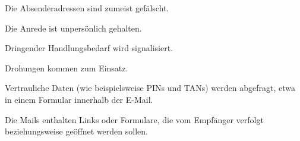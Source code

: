\item Die Absenderadressen sind zumeist gefälscht.
\item Die Anrede ist unpersönlich gehalten.
\item Dringender Handlungsbedarf wird signalisiert.
\item Drohungen kommen zum Einsatz.
\item Vertrauliche Daten (wie beispielsweise PINs und TANs) werden abgefragt, etwa in einem Formular innerhalb der E-Mail.
\item Die Mails enthalten Links oder Formulare, die vom Empfänger verfolgt beziehungsweise geöffnet werden sollen.